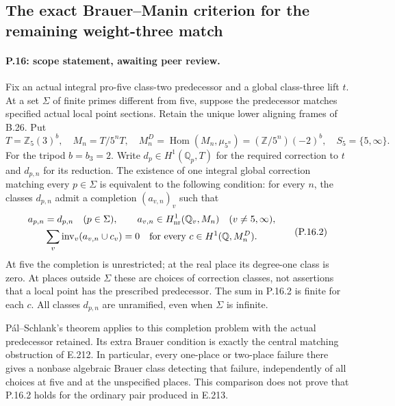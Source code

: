 \subsection{The exact Brauer--Manin criterion for the remaining weight-three match}

\paragraph{P.16: scope statement, awaiting peer review.}
Fix an actual integral pro-five class-two predecessor and a global
class-three lift $t$. At a set $\Sigma$ of finite primes different
from five, suppose the predecessor matches specified actual local
point sections. Retain the unique lower aligning frames of B.26.
Put
\[
 T=\mathbb Z_5(3)^b,\quad M_n=T/5^nT,\quad
 M_n^D=\operatorname{Hom}(M_n,\mu_{5^n})
       =(\mathbb Z/5^n)(-2)^b,\quad S_5=\{5,\infty\}.
 \tag{P.16.1}
\]
For the tripod $b=b_3=2$. Write $d_p\in H^1(\mathbb Q_p,T)$
for the required correction to $t$ and $d_{p,n}$ for its reduction.
The existence of one integral global correction matching every
$p\in\Sigma$ is equivalent to the following condition:
for every $n$, the classes $d_{p,n}$ admit a completion
$(a_{v,n})_v$ such that
\[
 \begin{gathered}
 a_{p,n}=d_{p,n}\quad(p\in\Sigma),\qquad
 a_{v,n}\in H^1_{\rm nr}(\mathbb Q_v,M_n)
                         \quad(v\ne5,\infty),\\
 \sum_v\operatorname{inv}_v(a_{v,n}\cup c_v)=0
                \quad\hbox{for every }c\in H^1(\mathbb Q,M_n^D).
 \end{gathered}
 \tag{P.16.2}
\]
At five the completion is unrestricted; at the real place its
degree-one class is zero. At places outside $\Sigma$ these are
choices of correction classes, not assertions that a local point
has the prescribed predecessor. The sum in P.16.2 is finite for
each $c$. All classes $d_{p,n}$ are unramified, even when
$\Sigma$ is infinite.

P\'al--Schlank's theorem applies to this completion problem with
the actual predecessor retained. Its extra Brauer condition is
exactly the central matching obstruction of E.212. In particular,
every one-place or two-place failure there gives a nonbase
algebraic Brauer class detecting that failure, independently of
all choices at five and at the unspecified places. This comparison
does not prove that P.16.2 holds for the ordinary pair produced
in E.213.

